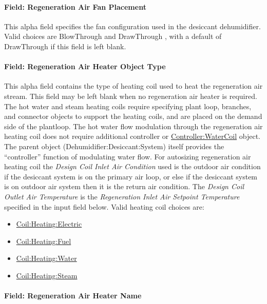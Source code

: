 \paragraph{Field: Regeneration Air Fan Placement}\label{field-regeneration-air-fan-placement}

This alpha field specifies the fan configuration used in the desiccant dehumidifier. Valid choices are BlowThrough and DrawThrough , with a default of DrawThrough if this field is left blank.

\paragraph{Field: Regeneration Air Heater Object Type}\label{field-regeneration-air-heater-object-type}

This alpha field contains the type of heating coil used to heat the regeneration air stream. This field may be left blank when no regeneration air heater is required. The hot water and steam heating coils require specifying plant loop, branches, and connector objects to support the heating coils, and are placed on the demand side of the plantloop. The hot water flow modulation through the regeneration air heating coil does not require additional controller or \hyperref[controllerwatercoil]{Controller:WaterCoil} object. The parent object (Dehumidifier:Desiccant:System) itself provides the ``controller'' function of modulating water flow. For autosizing regeneration air heating coil the \emph{Design Coil Inlet Air Condition} used is the outdoor air condition if the desiccant system is on the primary air loop, or else if the desiccant system is on outdoor air system then it is the return air condition. The \emph{Design Coil Outlet Air Temperature} is the \emph{Regeneration Inlet Air Setpoint Temperature} specified in the input field below. Valid heating coil choices are:

\begin{itemize}
\item
  \hyperref[coilheatingelectric]{Coil:Heating:Electric}
\item
  \hyperref[coilheatinggas-000]{Coil:Heating:Fuel}
\item
  \hyperref[coilheatingwater]{Coil:Heating:Water}
\item
  \hyperref[coilheatingsteam]{Coil:Heating:Steam}
\end{itemize}

\paragraph{Field: Regeneration Air Heater Name}\label{field-regeneration-air-heater-name}

